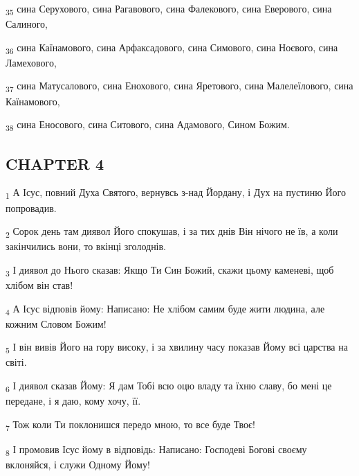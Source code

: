 \begin{tcolorbox}
\textsubscript{35} сина Серухового, сина Рагавового, сина Фалекового, сина Еверового, сина Салиного,
\end{tcolorbox}
\begin{tcolorbox}
\textsubscript{36} сина Каїнамового, сина Арфаксадового, сина Симового, сина Ноєвого, сина Ламехового,
\end{tcolorbox}
\begin{tcolorbox}
\textsubscript{37} сина Матусалового, сина Енохового, сина Яретового, сина Малелеїлового, сина Каїнамового,
\end{tcolorbox}
\begin{tcolorbox}
\textsubscript{38} сина Еносового, сина Ситового, сина Адамового, Сином Божим.
\end{tcolorbox}
\subsection{CHAPTER 4}
\begin{tcolorbox}
\textsubscript{1} А Ісус, повний Духа Святого, вернувсь з-над Йордану, і Дух на пустиню Його попровадив.
\end{tcolorbox}
\begin{tcolorbox}
\textsubscript{2} Сорок день там диявол Його спокушав, і за тих днів Він нічого не їв, а коли закінчились вони, то вкінці зголоднів.
\end{tcolorbox}
\begin{tcolorbox}
\textsubscript{3} І диявол до Нього сказав: Якщо Ти Син Божий, скажи цьому каменеві, щоб хлібом він став!
\end{tcolorbox}
\begin{tcolorbox}
\textsubscript{4} А Ісус відповів йому: Написано: Не хлібом самим буде жити людина, але кожним Словом Божим!
\end{tcolorbox}
\begin{tcolorbox}
\textsubscript{5} І він вивів Його на гору високу, і за хвилину часу показав Йому всі царства на світі.
\end{tcolorbox}
\begin{tcolorbox}
\textsubscript{6} І диявол сказав Йому: Я дам Тобі всю оцю владу та їхню славу, бо мені це передане, і я даю, кому хочу, її.
\end{tcolorbox}
\begin{tcolorbox}
\textsubscript{7} Тож коли Ти поклонишся передо мною, то все буде Твоє!
\end{tcolorbox}
\begin{tcolorbox}
\textsubscript{8} І промовив Ісус йому в відповідь: Написано: Господеві Богові своєму вклоняйся, і служи Одному Йому!
\end{tcolorbox}
